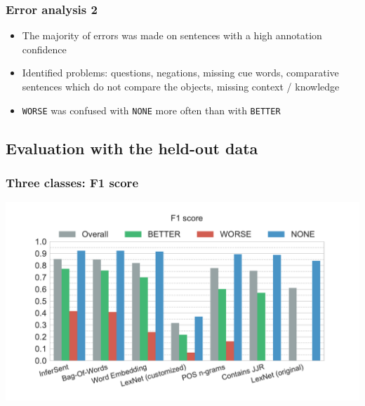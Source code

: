 \documentclass[11pt,aspectratio=169,usenames,dvipsnames]{beamer}
\begin{document}
    
    \begin{frame}[t]
        \frametitle{Error analysis 2}
        
        \begin{itemize}
         \item The majority of errors was made on sentences with a high annotation confidence
            \item Identified problems: questions, negations, missing cue words, comparative sentences which do not compare the objects, missing context / knowledge
            \item \texttt{WORSE} was confused with \texttt{NONE} more often than with \texttt{BETTER}
        \end{itemize}

        \end{frame}

    \subsection{Evaluation with the held-out data}
    \frame{\subsectionpage}

    \begin{frame}[t]
        \frametitle{Three classes: F1 score}
        \centerline{\includegraphics[scale=0.45,trim={0 0 0 0.5cm},clip]{images/experiments/hp-f1-False}}
    \end{frame}
\end{document}
